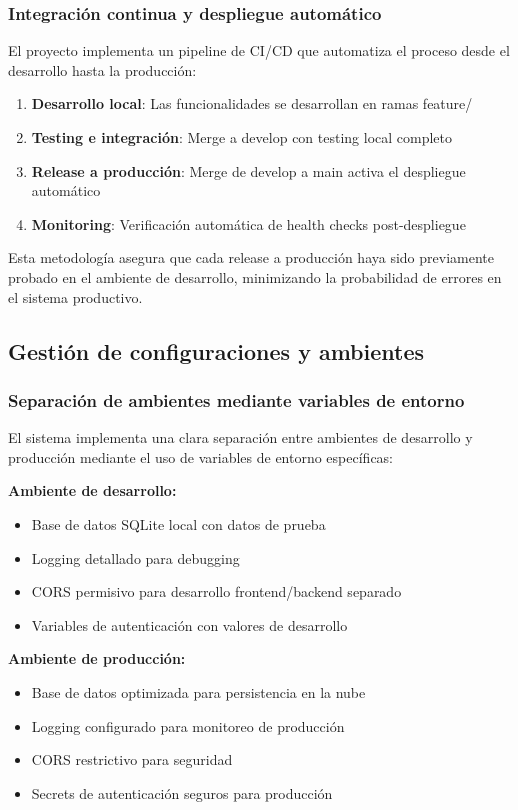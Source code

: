 \subsubsection{Integración continua y despliegue automático}

El proyecto implementa un pipeline de CI/CD que automatiza el proceso desde el desarrollo hasta la producción:

\begin{enumerate}
    \item \textbf{Desarrollo local}: Las funcionalidades se desarrollan en ramas feature/
    \item \textbf{Testing e integración}: Merge a develop con testing local completo
    \item \textbf{Release a producción}: Merge de develop a main activa el despliegue automático
    \item \textbf{Monitoring}: Verificación automática de health checks post-despliegue
\end{enumerate}

Esta metodología asegura que cada release a producción haya sido previamente probado en el ambiente de desarrollo, minimizando la probabilidad de errores en el sistema productivo.

\subsection{Gestión de configuraciones y ambientes}

\subsubsection{Separación de ambientes mediante variables de entorno}

El sistema implementa una clara separación entre ambientes de desarrollo y producción mediante el uso de variables de entorno específicas:

\textbf{Ambiente de desarrollo:}
\begin{itemize}
    \item Base de datos SQLite local con datos de prueba
    \item Logging detallado para debugging
    \item CORS permisivo para desarrollo frontend/backend separado
    \item Variables de autenticación con valores de desarrollo
\end{itemize}

\textbf{Ambiente de producción:}
\begin{itemize}
    \item Base de datos optimizada para persistencia en la nube
    \item Logging configurado para monitoreo de producción
    \item CORS restrictivo para seguridad
    \item Secrets de autenticación seguros para producción
\end{itemize}

